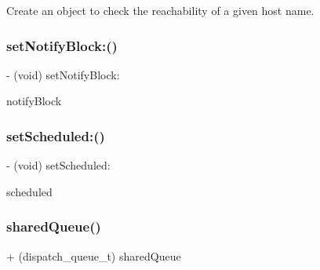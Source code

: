 Create an object to check the reachability of a given host name. 

\mbox{\label{interface_m_a_r_reachability_af67ad59328fec034a21ecda91131c2db}} 
\subsubsection{\texorpdfstring{set\+Notify\+Block\+:()}{setNotifyBlock:()}}
{\footnotesize\ttfamily -\/ (void) set\+Notify\+Block\+: \begin{DoxyParamCaption}\item[{(void($^\wedge$)(\hyperlink{interface_m_a_r_reachability}{M\+A\+R\+Reachability} $\ast$\hyperlink{interface_m_a_r_reachability_ad46b6909f162c589339d3a22b72d056d}{reachability}))}]{notify\+Block }\end{DoxyParamCaption}\hspace{0.3cm}{\ttfamily [implementation]}}

\mbox{\label{interface_m_a_r_reachability_a9fec680eafeaa0a2047b90c8507bba0d}} 
\subsubsection{\texorpdfstring{set\+Scheduled\+:()}{setScheduled:()}}
{\footnotesize\ttfamily -\/ (void) set\+Scheduled\+: \begin{DoxyParamCaption}\item[{(B\+O\+OL)}]{scheduled }\end{DoxyParamCaption}\hspace{0.3cm}{\ttfamily [implementation]}}

\mbox{\label{interface_m_a_r_reachability_a48b584d6d0261105cb2d5c4e50158833}} 
\subsubsection{\texorpdfstring{shared\+Queue()}{sharedQueue()}}
{\footnotesize\ttfamily + (dispatch\+\_\+queue\+\_\+t) shared\+Queue \begin{DoxyParamCaption}{ }\end{DoxyParamCaption}\hspace{0.3cm}{\ttfamily [implementation]}}

